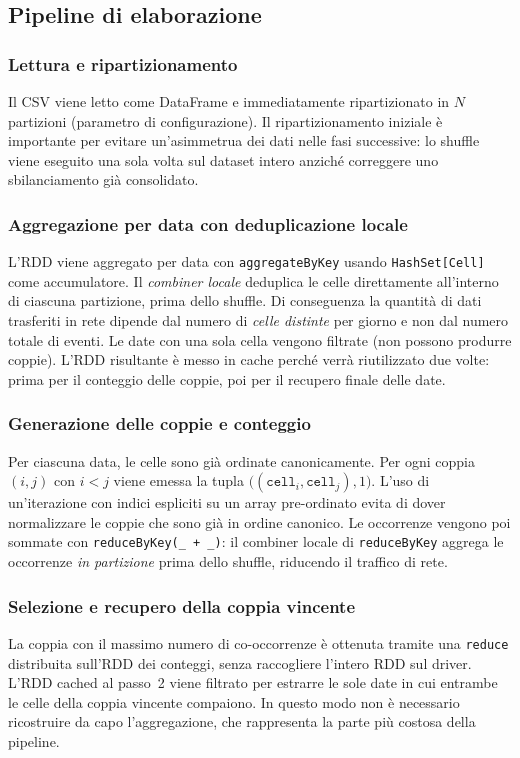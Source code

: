\documentclass[11pt,a4paper]{article}
\begin{document}
\subsection{Pipeline di elaborazione}

\subsubsection*{Lettura e ripartizionamento}
Il CSV viene letto come DataFrame e immediatamente ripartizionato in
$N$ partizioni (parametro di configurazione). Il ripartizionamento iniziale
è importante per evitare un'asimmetrua dei dati nelle fasi successive: lo shuffle viene
eseguito una sola volta sul dataset intero anziché correggere uno
sbilanciamento già consolidato.

\subsubsection*{Aggregazione per data con deduplicazione locale}
L'RDD viene aggregato per data con
\texttt{aggregateByKey} usando \texttt{HashSet[Cell]} come accumulatore.
Il \textit{combiner locale} deduplica le
celle direttamente all'interno di ciascuna partizione, prima dello shuffle.
Di conseguenza la quantità di dati trasferiti in rete dipende dal numero
di \textit{celle distinte} per giorno e non dal numero totale di eventi.
Le date con una sola cella vengono filtrate (non possono produrre coppie).
L'RDD risultante è messo in cache perché verrà
riutilizzato due volte: prima per il conteggio delle coppie, poi per il recupero
finale delle date.

\subsubsection*{Generazione delle coppie e conteggio}
Per ciascuna data, le celle sono già ordinate canonicamente. Per ogni
coppia $(i,j)$ con $i<j$ viene emessa la tupla
$\big((\texttt{cell}_i, \texttt{cell}_j), 1\big)$. L'uso di un'iterazione
con indici espliciti su un array pre-ordinato evita di dover normalizzare le coppie che sono già in ordine canonico. Le
occorrenze vengono poi sommate con \texttt{reduceByKey(\_ + \_)}: il
combiner locale di \texttt{reduceByKey} aggrega le occorrenze \textit{in
partizione} prima dello shuffle, riducendo il traffico di rete.

\subsubsection*{Selezione e recupero della coppia vincente}
La coppia con il massimo numero di co-occorrenze è ottenuta tramite una
\texttt{reduce} distribuita sull'RDD dei conteggi, senza raccogliere
l'intero RDD sul driver. L'RDD cached al passo~2 viene filtrato per estrarre le sole date in cui
entrambe le celle della coppia vincente compaiono. In questo modo non è
necessario ricostruire da capo l'aggregazione, che rappresenta la parte
più costosa della pipeline.
\end{document}
